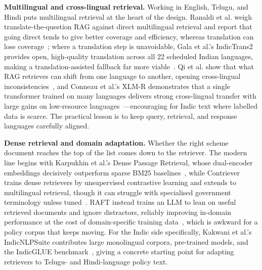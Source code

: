 \documentclass[conference]{IEEEtran}
\begin{document}
\textbf{Multilingual and cross-lingual retrieval.} Working in English, Telugu, and Hindi puts multilingual retrieval at the heart of the design. Ranaldi et al. weigh translate-the-question RAG against direct multilingual retrieval and report that going direct tends to give better coverage and efficiency, whereas translation can lose coverage~\cite{ranaldi2026multilingual}; where a translation step is unavoidable, Gala et al.'s IndicTrans2 provides open, high-quality translation across all 22 scheduled Indian languages, making a translation-assisted fallback far more viable~\cite{gala2023indictrans2}. Qi et al. show that what RAG retrieves can shift from one language to another, opening cross-lingual inconsistencies~\cite{qi2025consistency}, and Conneau et al.'s XLM-R demonstrates that a single transformer trained on many languages delivers strong cross-lingual transfer with large gains on low-resource languages~\cite{conneau2020xlmr}---encouraging for Indic text where labelled data is scarce. The practical lesson is to keep query, retrieval, and response languages carefully aligned.

\textbf{Dense retrieval and domain adaptation.} Whether the right scheme document reaches the top of the list comes down to the retriever. The modern line begins with Karpukhin et al.'s Dense Passage Retrieval, whose dual-encoder embeddings decisively outperform sparse BM25 baselines~\cite{karpukhin2020dpr}, while Contriever trains dense retrievers by unsupervised contrastive learning and extends to multilingual retrieval, though it can struggle with specialised government terminology unless tuned~\cite{izacard2022contriever}. RAFT instead trains an LLM to lean on useful retrieved documents and ignore distractors, reliably improving in-domain performance at the cost of domain-specific training data~\cite{zhang2024raft}, which is awkward for a policy corpus that keeps moving. For the Indic side specifically, Kakwani et al.'s IndicNLPSuite contributes large monolingual corpora, pre-trained models, and the IndicGLUE benchmark~\cite{kakwani2020indicnlp}, giving a concrete starting point for adapting retrievers to Telugu- and Hindi-language policy text.
\end{document}
